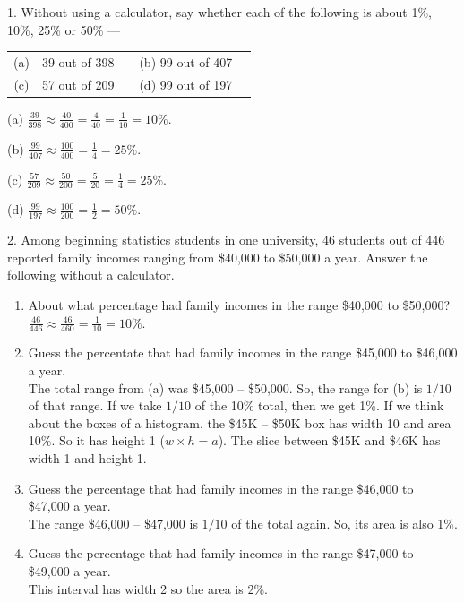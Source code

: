 \documentclass[10pt]{article}
\begin{document}
1.  Without using a calculator, 
say whether each of the following is about 1\%, 10\%, 25\% or 50\% ---
\begin{center}
\begin{tabular}{clccl}
(a) & 39 out of 398 & \hspace{2in}  & (b) 99 out of 407\\[10pt]
(c) & 57 out of 209 &               & (d) 99 out of 197
\end{tabular}
\end{center}

{\color{blue}

(a) $\frac{39}{398}\approx \frac{40}{400}=\frac{4}{40} =\frac{1}{10} = 10\%$.

(b) $\frac{99}{407}\approx \frac{100}{400}=\frac{1}{4}=25\%$.

(c) $\frac{57}{209}\approx \frac{50}{200}=\frac{5}{20}=\frac{1}{4}=25\%$.

(d) $\frac{99}{197}\approx \frac{100}{200}=\frac{1}{2}=50\%$.
}
\bigskip


2. Among beginning statistics students in one university, 46 students
out of 446 reported family incomes ranging from \$40,000 to \$50,000 a year.
Answer the following without a calculator.
\begin{enumerate}
\item[(a)] About what percentage had family incomes in the range \$40,000 
  to \$50,000?\\
 {\color{blue} $\frac{46}{446}\approx \frac{46}{460}=\frac{1}{10}=10\%$.}
\item[(b)] Guess the percentate that had family incomes in the range \$45,000 to \$46,000
   a year.\\
  {\color{blue} The total range from (a) was \$45,000 -- \$50,000.  So, the range for (b)
    is $1/10$ of that range.  If we take $1/10$ of the 10\% total, then we get 1\%.
    If we think about the boxes of a histogram.  the \$45K -- \$50K box has width 10 and area 10\%.
    So it has height 1 ($w\times h = a$). The slice between \$45K and \$46K has width 1 and height 1.}
\item[(c)] Guess the percentage that had family incomes in the range \$46,000 to
   \$47,000 a year.\\
  {\color{blue}  The range \$46,000 -- \$47,000 is $1/10$ of the total again.  So, its area is also 1\%.}
\item[(d)] Guess the percentage that had family incomes in the range \$47,000 to
   \$49,000 a year.\\
{\color{blue} This interval has width 2 so the area is 2\%.}
\end{enumerate}
\end{document}
